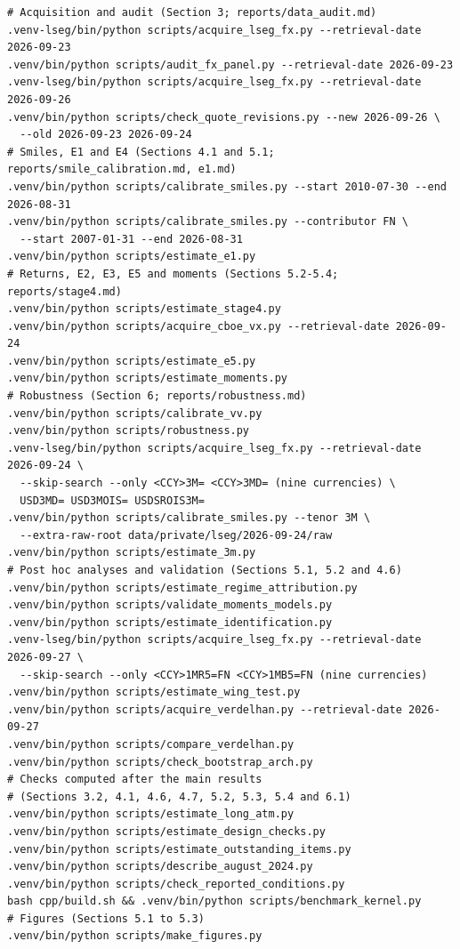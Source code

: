 \documentclass[11pt]{article}
\theoremstyle{result}
\begin{document}
{\small\begin{verbatim}
# Acquisition and audit (Section 3; reports/data_audit.md)
.venv-lseg/bin/python scripts/acquire_lseg_fx.py --retrieval-date 2026-09-23
.venv/bin/python scripts/audit_fx_panel.py --retrieval-date 2026-09-23
.venv-lseg/bin/python scripts/acquire_lseg_fx.py --retrieval-date 2026-09-26
.venv/bin/python scripts/check_quote_revisions.py --new 2026-09-26 \
  --old 2026-09-23 2026-09-24
# Smiles, E1 and E4 (Sections 4.1 and 5.1; reports/smile_calibration.md, e1.md)
.venv/bin/python scripts/calibrate_smiles.py --start 2010-07-30 --end 2026-08-31
.venv/bin/python scripts/calibrate_smiles.py --contributor FN \
  --start 2007-01-31 --end 2026-08-31
.venv/bin/python scripts/estimate_e1.py
# Returns, E2, E3, E5 and moments (Sections 5.2-5.4; reports/stage4.md)
.venv/bin/python scripts/estimate_stage4.py
.venv/bin/python scripts/acquire_cboe_vx.py --retrieval-date 2026-09-24
.venv/bin/python scripts/estimate_e5.py
.venv/bin/python scripts/estimate_moments.py
# Robustness (Section 6; reports/robustness.md)
.venv/bin/python scripts/calibrate_vv.py
.venv/bin/python scripts/robustness.py
.venv-lseg/bin/python scripts/acquire_lseg_fx.py --retrieval-date 2026-09-24 \
  --skip-search --only <CCY>3M= <CCY>3MD= (nine currencies) \
  USD3MD= USD3MOIS= USDSROIS3M=
.venv/bin/python scripts/calibrate_smiles.py --tenor 3M \
  --extra-raw-root data/private/lseg/2026-09-24/raw
.venv/bin/python scripts/estimate_3m.py
# Post hoc analyses and validation (Sections 5.1, 5.2 and 4.6)
.venv/bin/python scripts/estimate_regime_attribution.py
.venv/bin/python scripts/validate_moments_models.py
.venv/bin/python scripts/estimate_identification.py
.venv-lseg/bin/python scripts/acquire_lseg_fx.py --retrieval-date 2026-09-27 \
  --skip-search --only <CCY>1MR5=FN <CCY>1MB5=FN (nine currencies)
.venv/bin/python scripts/estimate_wing_test.py
.venv/bin/python scripts/acquire_verdelhan.py --retrieval-date 2026-09-27
.venv/bin/python scripts/compare_verdelhan.py
.venv/bin/python scripts/check_bootstrap_arch.py
# Checks computed after the main results
# (Sections 3.2, 4.1, 4.6, 4.7, 5.2, 5.3, 5.4 and 6.1)
.venv/bin/python scripts/estimate_long_atm.py
.venv/bin/python scripts/estimate_design_checks.py
.venv/bin/python scripts/estimate_outstanding_items.py
.venv/bin/python scripts/describe_august_2024.py
.venv/bin/python scripts/check_reported_conditions.py
bash cpp/build.sh && .venv/bin/python scripts/benchmark_kernel.py
# Figures (Sections 5.1 to 5.3)
.venv/bin/python scripts/make_figures.py
\end{verbatim}}
\end{document}
